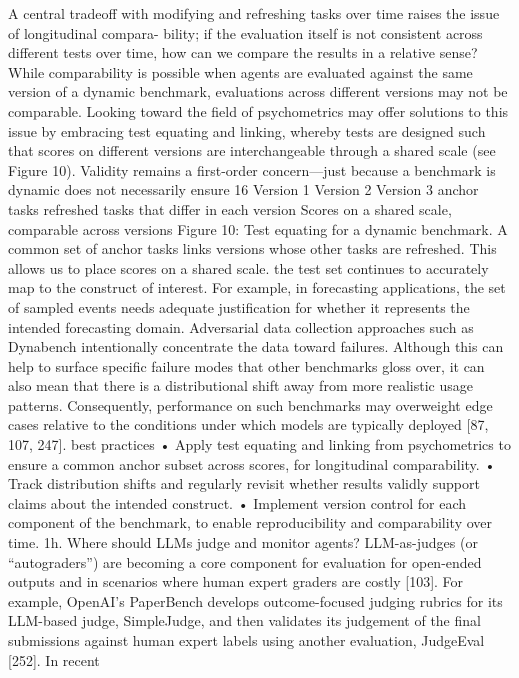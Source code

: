 A central tradeoff with modifying and refreshing tasks over time raises the issue of longitudinal compara-
bility; if the evaluation itself is not consistent across different tests over time, how can we compare the
results in a relative sense? While comparability is possible when agents are evaluated against the same
version of a dynamic benchmark, evaluations across different versions may not be comparable. Looking
toward the field of psychometrics may offer solutions to this issue by embracing test equating and linking,
whereby tests are designed such that scores on different versions are interchangeable through a shared
scale (see Figure 10).
Validity remains a first-order concern—just because a benchmark is dynamic does not necessarily ensure
16
Version 1
Version 2
Version 3
anchor tasks
refreshed tasks that differ in each version
Scores on a shared scale,
comparable across versions
Figure 10: Test equating for a dynamic benchmark. A common set of anchor tasks links versions whose other tasks
are refreshed. This allows us to place scores on a shared scale.
the test set continues to accurately map to the construct of interest. For example, in forecasting applications,
the set of sampled events needs adequate justification for whether it represents the intended forecasting
domain. Adversarial data collection approaches such as Dynabench intentionally concentrate the data
toward failures. Although this can help to surface specific failure modes that other benchmarks gloss over,
it can also mean that there is a distributional shift away from more realistic usage patterns. Consequently,
performance on such benchmarks may overweight edge cases relative to the conditions under which models
are typically deployed [87, 107, 247].
best practices
• Apply test equating and linking from psychometrics to ensure a common anchor subset across scores, for
longitudinal comparability.
• Track distribution shifts and regularly revisit whether results validly support claims about the intended
construct.
• Implement version control for each component of the benchmark, to enable reproducibility and comparability
over time.
1h. Where should LLMs judge and monitor agents?
LLM-as-judges (or “autograders”) are becoming a core component for evaluation for open-ended outputs
and in scenarios where human expert graders are costly [103]. For example, OpenAI’s PaperBench develops
outcome-focused judging rubrics for its LLM-based judge, SimpleJudge, and then validates its judgement
of the final submissions against human expert labels using another evaluation, JudgeEval [252]. In recent
